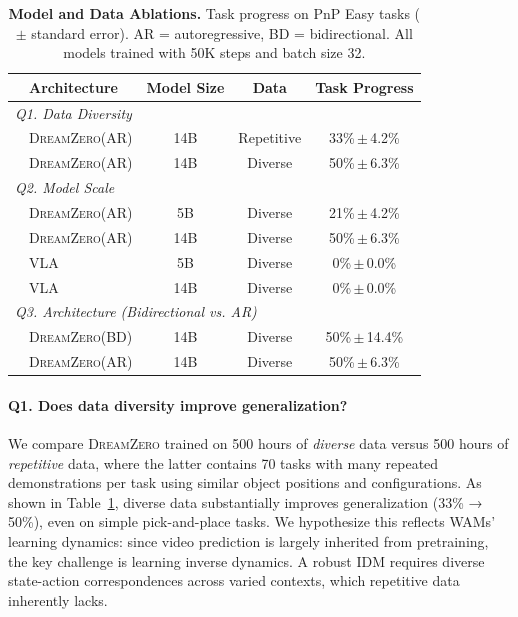 \documentclass[10pt,logo,copyright]{nvidiatechreport}
\newcommand{\ourmethod}{\mbox{\textsc{DreamZero}}\xspace}
\begin{document}
\begin{table}[ht!]
\centering
\small
{}
\setlength{\tabcolsep}{10pt}
\begin{tabular}{@{}llccc@{}} 
\toprule
& \textbf{Architecture} & \textbf{Model Size} & \textbf{Data} & \textbf{Task Progress} \\
\midrule
\multicolumn{5}{l}{\textit{Q1. Data Diversity}} \\
& \ourmethod (AR) & 14B & Repetitive & 33\%\scriptsize{\,$\pm$\,4.2\%} \\
& \ourmethod (AR) & 14B & Diverse    & 50\%\scriptsize{\,$\pm$\,6.3\%} \\
\midrule
\multicolumn{5}{l}{\textit{Q2. Model Scale}} \\
& \ourmethod (AR) & 5B  & Diverse & 21\%\scriptsize{\,$\pm$\,4.2\%} \\
& \ourmethod (AR) & 14B & Diverse & 50\%\scriptsize{\,$\pm$\,6.3\%} \\
& VLA             & 5B  & Diverse & \phantom{5}0\%\scriptsize{\,$\pm$\,0.0\%} \\
& VLA             & 14B & Diverse & \phantom{5}0\%\scriptsize{\,$\pm$\,0.0\%} \\
\midrule
\multicolumn{5}{l}{\textit{Q3. Architecture (Bidirectional vs. AR)}} \\
& \ourmethod (BD) & 14B & Diverse & 50\%\scriptsize{\,$\pm$\,14.4\%} \\
& \ourmethod (AR) & 14B & Diverse & 50\%\scriptsize{\,$\pm$\,6.3\%} \\
\bottomrule
\end{tabular}
\caption{\textbf{Model and Data Ablations.} Task progress on PnP Easy tasks ($\pm$ standard error). AR = autoregressive, BD = bidirectional. All models trained with 50K steps and batch size 32.}
\label{tab:ablation}
\end{table}

\paragraph{Q1. Does data diversity improve generalization?}

We compare \ourmethod trained on 500 hours of \textit{diverse} data versus 500 hours of \textit{repetitive} data, where the latter contains 70 tasks with many repeated demonstrations per task using similar object positions and configurations. As shown in Table~\ref{tab:ablation}, diverse data substantially improves generalization (33\% → 50\%), even on simple pick-and-place tasks. We hypothesize this reflects WAMs' learning dynamics: since video prediction is largely inherited from pretraining, the key challenge is learning inverse dynamics. A robust IDM requires diverse state-action correspondences across varied contexts, which repetitive data inherently lacks.
\end{document}
